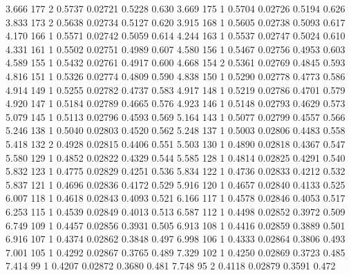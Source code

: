 \documentclass[handout,12pt,dvipsnames,t]{beamer}
\begin{document}
\begin{frame}[fragile]
{\begin{Schunk}
\begin{Soutput}
  3.666    177       2   0.5737 0.02721       0.5228        0.630
  3.669    175       1   0.5704 0.02726       0.5194        0.626
  3.833    173       2   0.5638 0.02734       0.5127        0.620
  3.915    168       1   0.5605 0.02738       0.5093        0.617
  4.170    166       1   0.5571 0.02742       0.5059        0.614
  4.244    163       1   0.5537 0.02747       0.5024        0.610
  4.331    161       1   0.5502 0.02751       0.4989        0.607
  4.580    156       1   0.5467 0.02756       0.4953        0.603
  4.589    155       1   0.5432 0.02761       0.4917        0.600
  4.668    154       2   0.5361 0.02769       0.4845        0.593
  4.816    151       1   0.5326 0.02774       0.4809        0.590
  4.838    150       1   0.5290 0.02778       0.4773        0.586
  4.914    149       1   0.5255 0.02782       0.4737        0.583
  4.917    148       1   0.5219 0.02786       0.4701        0.579
  4.920    147       1   0.5184 0.02789       0.4665        0.576
  4.923    146       1   0.5148 0.02793       0.4629        0.573
  5.079    145       1   0.5113 0.02796       0.4593        0.569
  5.164    143       1   0.5077 0.02799       0.4557        0.566
  5.246    138       1   0.5040 0.02803       0.4520        0.562
  5.248    137       1   0.5003 0.02806       0.4483        0.558
  5.418    132       2   0.4928 0.02815       0.4406        0.551
  5.503    130       1   0.4890 0.02818       0.4367        0.547
  5.580    129       1   0.4852 0.02822       0.4329        0.544
  5.585    128       1   0.4814 0.02825       0.4291        0.540
  5.832    123       1   0.4775 0.02829       0.4251        0.536
  5.834    122       1   0.4736 0.02833       0.4212        0.532
  5.837    121       1   0.4696 0.02836       0.4172        0.529
  5.916    120       1   0.4657 0.02840       0.4133        0.525
  6.007    118       1   0.4618 0.02843       0.4093        0.521
  6.166    117       1   0.4578 0.02846       0.4053        0.517
  6.253    115       1   0.4539 0.02849       0.4013        0.513
  6.587    112       1   0.4498 0.02852       0.3972        0.509
  6.749    109       1   0.4457 0.02856       0.3931        0.505
  6.913    108       1   0.4416 0.02859       0.3889        0.501
  6.916    107       1   0.4374 0.02862       0.3848        0.497
  6.998    106       1   0.4333 0.02864       0.3806        0.493
  7.001    105       1   0.4292 0.02867       0.3765        0.489
  7.329    102       1   0.4250 0.02869       0.3723        0.485
  7.414     99       1   0.4207 0.02872       0.3680        0.481
  7.748     95       2   0.4118 0.02879       0.3591        0.472

\end{Soutput}
\end{Schunk}}
\end{frame}
\end{document}
